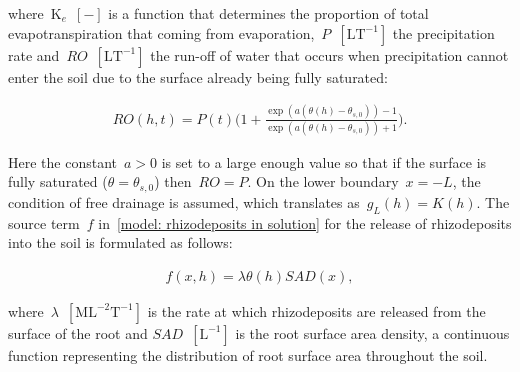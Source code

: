\documentclass[11pt,a4paper]{article}
\numberwithin{equation}{section}
\begin{document}
where~$\text{K}_e$~$[-]$ is a function that determines the proportion of total evapotranspiration that coming from evaporation,~$P$~$[\text{LT}^{-1}]$ the precipitation rate and~$RO$~$[\text{LT}^{-1}]$ the run-off of water that occurs when precipitation cannot enter the soil due to the surface already being fully saturated:
\begin{linenomath*}
	\begin{equation}\label{model: runoff function}
		\begin{aligned}
			RO(h,t) = P(t)\Big(1+\frac{\exp(a(\theta(h)-\theta_{s,0})) - 1}{\exp(a(\theta(h)-\theta_{s,0})) + 1}\Big). 
		\end{aligned}
	\end{equation}
\end{linenomath*}
Here the constant~$a>0$ is set to a large enough value so that if the surface is fully saturated ($\theta = \theta_{s, 0}$) then~$RO = P$. On the lower boundary~$x=-L$, the condition of free drainage is assumed, which translates as~$g_L(h) = K(h)$. The source term~$f$ in~\eqref{model: rhizodeposits in solution} for the release of rhizodeposits into the soil is formulated as follows:
\begin{linenomath*}
	\begin{equation}\label{model: rhizodeposit release}
		\begin{aligned}
			f(x,h) = \lambda\theta(h) SAD(x),
		\end{aligned}	
	\end{equation}
\end{linenomath*}
where~$\lambda$~$[\text{M}\text{L}^{-2}\text{T}^{-1}]$ is the rate at which rhizodeposits are released from the surface of the root and $SAD$~$[\text{L}^{-1}]$ is the root surface area density, a continuous function representing the distribution of root surface area throughout the soil. 
\end{document}

